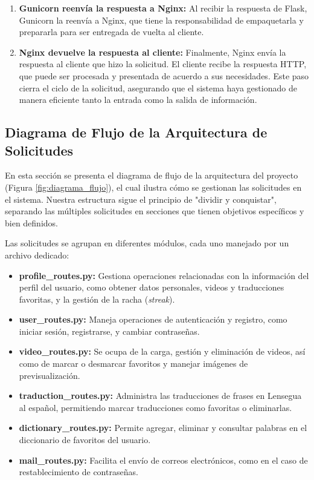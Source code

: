\begin{enumerate}
    \item \textbf{Gunicorn reenvía la respuesta a Nginx:} 
    Al recibir la respuesta de Flask, Gunicorn la reenvía a Nginx, que tiene la responsabilidad de empaquetarla y prepararla para ser entregada de vuelta al cliente.

    \item \textbf{Nginx devuelve la respuesta al cliente:} 
    Finalmente, Nginx envía la respuesta al cliente que hizo la solicitud. El cliente recibe la respuesta HTTP, que puede ser procesada y presentada de acuerdo a sus necesidades. Este paso cierra el ciclo de la solicitud, asegurando que el sistema haya gestionado de manera eficiente tanto la entrada como la salida de información.
\end{enumerate}

\subsection{Diagrama de Flujo de la Arquitectura de Solicitudes}

En esta sección se presenta el diagrama de flujo de la arquitectura del proyecto (Figura \ref{fig:diagrama_flujo}), el cual ilustra cómo se gestionan las solicitudes en el sistema. Nuestra estructura sigue el principio de "dividir y conquistar", separando las múltiples solicitudes en secciones que tienen objetivos específicos y bien definidos. 

Las solicitudes se agrupan en diferentes módulos, cada uno manejado por un archivo dedicado:
\begin{itemize}
    \item \textbf{profile\_routes.py:} Gestiona operaciones relacionadas con la información del perfil del usuario, como obtener datos personales, videos y traducciones favoritas, y la gestión de la racha (\textit{streak}).
    \item \textbf{user\_routes.py:} Maneja operaciones de autenticación y registro, como iniciar sesión, registrarse, y cambiar contraseñas.
    \item \textbf{video\_routes.py:} Se ocupa de la carga, gestión y eliminación de videos, así como de marcar o desmarcar favoritos y manejar imágenes de previsualización.
    \item \textbf{traduction\_routes.py:} Administra las traducciones de frases en Lensegua al español, permitiendo marcar traducciones como favoritas o eliminarlas.
    \item \textbf{dictionary\_routes.py:} Permite agregar, eliminar y consultar palabras en el diccionario de favoritos del usuario.
    \item \textbf{mail\_routes.py:} Facilita el envío de correos electrónicos, como en el caso de restablecimiento de contraseñas.
\end{itemize}


